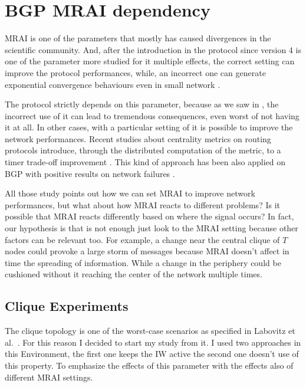 \chapter{BGP MRAI dependency}
\label{cha:bgp_mrai_experiments}

\ac{MRAI} is one of the parameters that mostly has caused divergences in the
scientific community.
And, after the introduction in the protocol since version 4 \cite{rfc4271}
is one of the parameter more studied for it multiple effects, the correct setting
can improve the protocol performances, while, an incorrect one can generate
exponential convergence behaviours even in small network
\cite{fabrikant2011there,griffin2001experimental}.

The protocol strictly depends on this parameter, because as we saw in ,
the incorrect use of it can lead to tremendous consequences, even worst of not
having it at all.
In other cases, with a particular setting of it is possible to improve the network
performances.
Recent studies about centrality metrics on routing protocols introduce, through
the distributed computation of the metric, to a
timer trade-off improvement \cite{MaLo18_ToN,GhiMa18_infocom}.
This kind of approach has been also applied on \ac{BGP} with positive results on
network failures \cite{milani2019BGP,milani2020improving}.

All those study points out how we can set \ac{MRAI} to improve network
performances, but what about how \ac{MRAI} reacts to different problems?
Is it possible that \ac{MRAI} reacts differently based on where the signal
occurs?
In fact, our hypothesis is that is not enough just look to the \ac{MRAI} setting
because other factors can be relevant too.
For example, a change near the central clique of $T$ nodes could provoke a large
storm of messages because \ac{MRAI} doesn't affect in time the spreading of information.
While a change in the periphery could be cushioned without it reaching the center
of the network multiple times.

\section{Clique Experiments}
\label{sec:bgp_mrai_clique}

The clique topology is one of the worst-case scenarios as specified in Labovitz et al.~\cite{labovitz2000delayed}.
For this reason I decided to start my study from it.
I used two approaches in this Environment, the first one keeps the \ac{IW} active
the second one doesn't use of this property.
To emphasize the effects of this parameter with the effects also of different
\ac{MRAI} settings.

